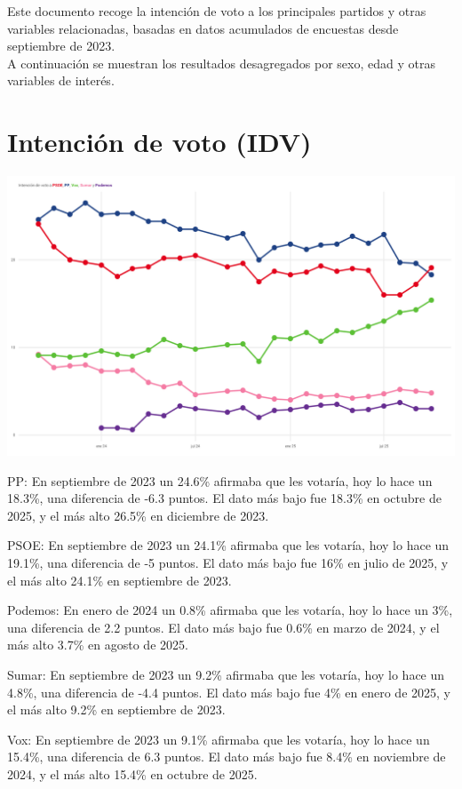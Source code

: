 \documentclass[
  letterpaper,
  DIV=11,
  numbers=noendperiod]{scrreprt}
\begin{document}
Este documento recoge la intención de voto a los principales partidos y
otras variables relacionadas, basadas en datos acumulados de encuestas
desde septiembre de 2023.\\
A continuación se muestran los resultados desagregados por sexo, edad y
otras variables de interés.


\chapter{Intención de voto (IDV)}\label{intenciuxf3n-de-voto-idv}

\includegraphics[width=8in,height=\textheight,keepaspectratio]{figures/p_idv_static.png}

{PP}: En septiembre de 2023 un 24.6\% afirmaba que les votaría, hoy lo
hace un 18.3\%, una diferencia de -6.3 puntos. El dato más bajo fue
18.3\% en octubre de 2025, y el más alto 26.5\% en diciembre de 2023.

{PSOE}: En septiembre de 2023 un 24.1\% afirmaba que les votaría, hoy lo
hace un 19.1\%, una diferencia de -5 puntos. El dato más bajo fue 16\%
en julio de 2025, y el más alto 24.1\% en septiembre de 2023.

{Podemos}: En enero de 2024 un 0.8\% afirmaba que les votaría, hoy lo
hace un 3\%, una diferencia de 2.2 puntos. El dato más bajo fue 0.6\% en
marzo de 2024, y el más alto 3.7\% en agosto de 2025.

{Sumar}: En septiembre de 2023 un 9.2\% afirmaba que les votaría, hoy lo
hace un 4.8\%, una diferencia de -4.4 puntos. El dato más bajo fue 4\%
en enero de 2025, y el más alto 9.2\% en septiembre de 2023.

{Vox}: En septiembre de 2023 un 9.1\% afirmaba que les votaría, hoy lo
hace un 15.4\%, una diferencia de 6.3 puntos. El dato más bajo fue 8.4\%
en noviembre de 2024, y el más alto 15.4\% en octubre de 2025.
\end{document}
